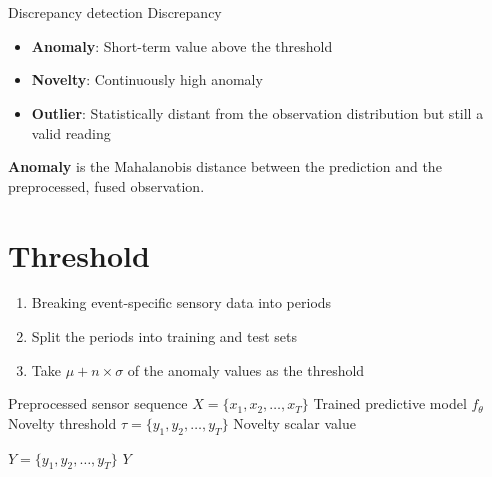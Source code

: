 \section{}
    \begin{frame}[allowframebreaks]{Discrepancy detection}
        Discrepancy
        \begin{itemize}
            \item \textbf{Anomaly}: Short-term value above the threshold
            \item \textbf{Novelty}: Continuously high anomaly
            \item \textbf{Outlier}: Statistically distant from the observation distribution but still a valid reading
        \end{itemize}

        \textbf{Anomaly} is the Mahalanobis distance between the prediction and the preprocessed, fused observation.


        \section{Threshold}
            \begin{enumerate}
                \item Breaking event-specific sensory data into periods
                \item Split the periods into training and test sets
                \item Take $\mu + n \times \sigma$ of the anomaly values as the threshold
            \end{enumerate}

            \begin{algorithm}[H]
		\caption{Novelty Detection from Sensor Sequences}
        \begin{algorithmic}[1]
			\Require Preprocessed sensor sequence $X = \{x_1, x_2, \dots, x_T\}$
            \Require Trained predictive model $f_{\theta}$
            \Ensure Novelty threshold $\tau = \{y_1, y_2, \dots, y_T\}$
            \Ensure Novelty scalar value


            $Y = \{y_1, y_2, \dots, y_T\}$
            \State \Return $Y$
        \end{algorithmic}
            \end{algorithm}
    \end{frame}

    \subsection{}
        
